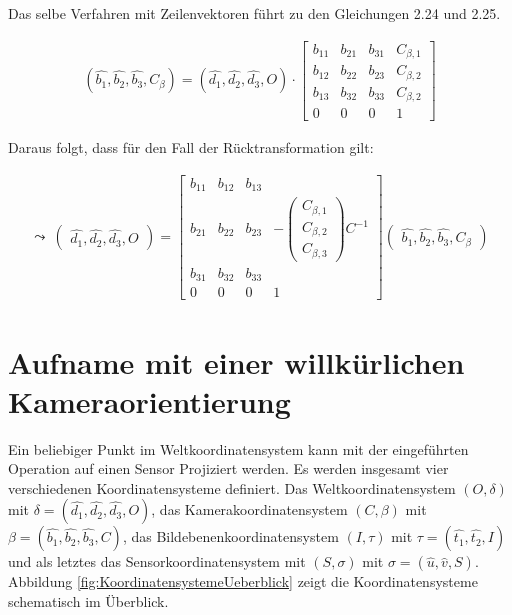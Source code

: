 Das selbe Verfahren mit Zeilenvektoren führt zu den Gleichungen 2.24 und 2.25.


\begin{gather}
	(\hat{b_1}, \hat{b_2}, \hat{b_3}, C_\beta) = (\hat{d_1},\hat{d_2}, \hat{d_3}, O) \cdot
	\begin{bmatrix} 
		b_{11} & b_{21} & b_{31} & C_{\beta,1}\\
		b_{12} & b_{22} & b_{23} & C_{\beta,2}\\
		b_{13} & b_{32} & b_{33} & C_{\beta,2}\\
		0           &       0       &   0         & 1   
	\end{bmatrix}
\end{gather}	

Daraus folgt, dass für den Fall der Rücktransformation gilt:

\begin{gather}
	\leadsto \: \begin{pmatrix}
		\hat{d_1},\hat{d_2},\hat{d_3},O
	\end{pmatrix} = 
	\begin{bmatrix}
		b_{11} & b_{12} & b_{13} & \\
		b_{21} & b_{22} & b_{23} &  -\begin{pmatrix}
			C_{\beta,1}\\
			C_{\beta,2}\\
			C_{\beta,3}
		\end{pmatrix}C^{-1}\\
		b_{31} & b_{32} & b_{33} & \\
		0&0&0 & 1
	\end{bmatrix}
	\begin{pmatrix}
		\hat{b_1},\hat{b_2},\hat{b_3},C_\beta
	\end{pmatrix}
\end{gather}	

\pagebreak


\section{Aufname mit einer willkürlichen Kameraorientierung}

Ein beliebiger Punkt im Weltkoordinatensystem kann mit der eingeführten Operation auf einen Sensor Projiziert werden. Es werden insgesamt vier verschiedenen Koordinatensysteme definiert.
Das Weltkoordinatensystem $(O,\delta)$ mit $\delta =(\hat{d_1}, \hat{d_2},\hat{d_3},O)$, das Kamerakoordinatensystem $(C,\beta)$ mit $\beta = (\hat{b_1},\hat{b_2},\hat{b_3},C)$, das Bildebenenkoordinatensystem $(I,\tau)$ mit $\tau = (\hat{t_1},\hat{t_2},I)$ und als letztes das Sensorkoordinatensystem mit $(S,\sigma)$ mit $\sigma = (\hat{u},\hat{v},S)$. Abbildung \ref{fig:KoordinatensystemeUeberblick} zeigt die Koordinatensysteme schematisch im Überblick. 


